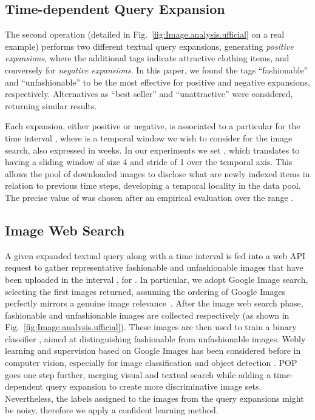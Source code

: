 \documentclass[runningheads]{llncs}
\newcommand{\snamebig}[0] {POP\xspace}
\begin{document}
\subsection{Time-dependent Query Expansion}\label{sec:TDQE} The second operation (detailed in Fig.~\ref{fig:Image.analysis.ufficial} on a real example) performs two different textual query expansions, generating \emph{positive expansions},  where the additional  tags indicate attractive clothing items, and conversely for \emph{negative expansions}. In this paper, we found the tags  ``fashionable'' and  ``unfashionable'' to be the most effective for positive and negative expansions, respectively. Alternatives as ``best seller'' and ``unattractive'' were considered, returning similar results. 

Each expansion, either positive or negative, is associated to a particular  for the time interval , where  is a temporal window we wish to consider for the image search, also expressed in weeks. In our experiments we set , which translates to having a sliding window of size 4 and stride of 1 over the temporal axis. This allows the pool of downloaded images to disclose what are newly indexed items in relation to previous time steps, developing a temporal locality in the data pool. The precise value of  was chosen after an empirical evaluation over the range . 

\subsection{Image Web Search} \label{sec:IWS} A given expanded textual query along with a time interval is fed into a web API request to gather  representative fashionable and unfashionable images  that have been uploaded in the interval , for . In particular, we adopt Google Image search,
selecting the first  images returned, assuming the ordering of Google Images perfectly mirrors a genuine image relevance~\cite{google_visualrank}. After the image web search phase,  fashionable and unfashionable images are collected respectively (as shown in Fig.~\ref{fig:Image.analysis.ufficial}). These images are then used to train a binary classifier , aimed at distinguishing fashionable from unfashionable images. Webly learning and supervision based on Google Images has been considered before in computer vision, especially for image classification and object detection \cite{Fergus_googleimages_2005,chen_webly_2015,Li_webly_2021}. \snamebig goes one step further, merging visual and textual search while adding a time-dependent query expansion to create more discriminative image sets. Nevertheless, the labels assigned to the images from the query expansions might be noisy, therefore we apply a confident learning method.
\end{document}
